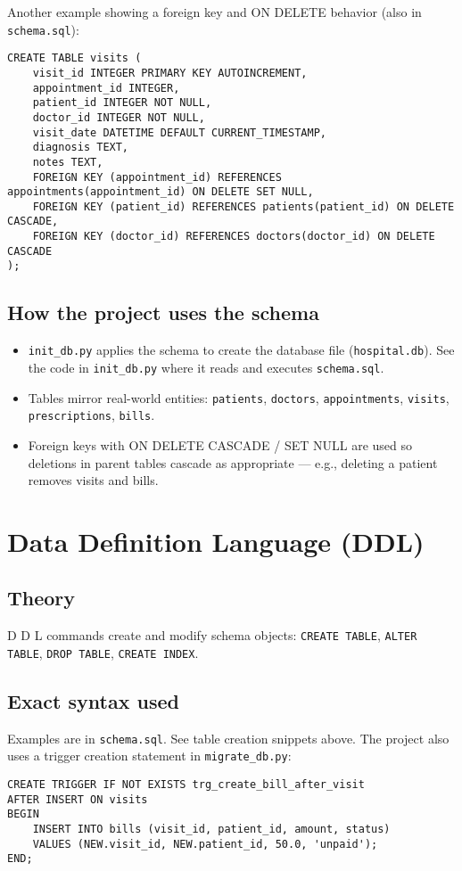 \documentclass[11pt,a4paper]{article}
\begin{document}
Another example showing a foreign key and ON DELETE behavior (also in \texttt{schema.sql}):
\begin{lstlisting}
CREATE TABLE visits (
    visit_id INTEGER PRIMARY KEY AUTOINCREMENT,
    appointment_id INTEGER,
    patient_id INTEGER NOT NULL,
    doctor_id INTEGER NOT NULL,
    visit_date DATETIME DEFAULT CURRENT_TIMESTAMP,
    diagnosis TEXT,
    notes TEXT,
    FOREIGN KEY (appointment_id) REFERENCES appointments(appointment_id) ON DELETE SET NULL,
    FOREIGN KEY (patient_id) REFERENCES patients(patient_id) ON DELETE CASCADE,
    FOREIGN KEY (doctor_id) REFERENCES doctors(doctor_id) ON DELETE CASCADE
);
\end{lstlisting}

\subsection{How the project uses the schema}
\begin{itemize}
  \item \texttt{init_db.py} applies the schema to create the database file (\texttt{hospital.db}). See the code in \texttt{init_db.py} where it reads and executes \texttt{schema.sql}.
  \item Tables mirror real-world entities: \texttt{patients}, \texttt{doctors}, \texttt{appointments}, \texttt{visits}, \texttt{prescriptions}, \texttt{bills}.
  \item Foreign keys with ON DELETE CASCADE / SET NULL are used so deletions in parent tables cascade as appropriate — e.g., deleting a patient removes visits and bills.
\end{itemize}

\section{Data Definition Language (DDL)}
\subsection{Theory}
D D L commands create and modify schema objects: \texttt{CREATE TABLE}, \texttt{ALTER TABLE}, \texttt{DROP TABLE}, \texttt{CREATE INDEX}.

\subsection{Exact syntax used}
Examples are in \texttt{schema.sql}. See table creation snippets above. The project also uses a trigger creation statement in \texttt{migrate_db.py}:
\begin{lstlisting}
CREATE TRIGGER IF NOT EXISTS trg_create_bill_after_visit
AFTER INSERT ON visits
BEGIN
    INSERT INTO bills (visit_id, patient_id, amount, status)
    VALUES (NEW.visit_id, NEW.patient_id, 50.0, 'unpaid');
END;
\end{lstlisting}
\end{document}
